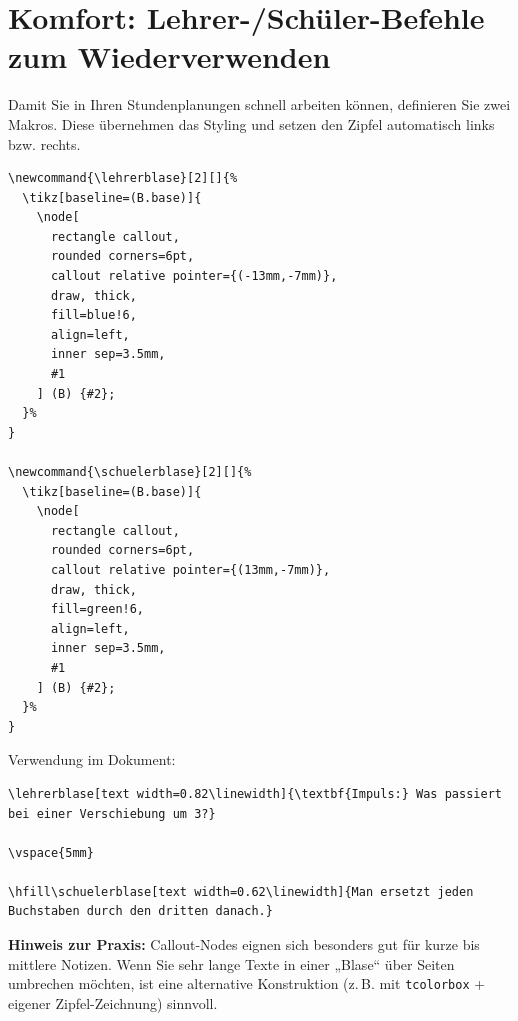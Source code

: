 \begin{ausgabe}
\begin{center}
\end{center}
\end{ausgabe}

\section{Komfort: Lehrer-/Schüler-Befehle zum Wiederverwenden}

Damit Sie in Ihren Stundenplanungen schnell arbeiten können, definieren Sie zwei Makros. Diese übernehmen das Styling und setzen den Zipfel automatisch links bzw. rechts.

\begin{lstlisting}[style=latex]
\newcommand{\lehrerblase}[2][]{%
  \tikz[baseline=(B.base)]{
    \node[
      rectangle callout,
      rounded corners=6pt,
      callout relative pointer={(-13mm,-7mm)},
      draw, thick,
      fill=blue!6,
      align=left,
      inner sep=3.5mm,
      #1
    ] (B) {#2};
  }%
}

\newcommand{\schuelerblase}[2][]{%
  \tikz[baseline=(B.base)]{
    \node[
      rectangle callout,
      rounded corners=6pt,
      callout relative pointer={(13mm,-7mm)},
      draw, thick,
      fill=green!6,
      align=left,
      inner sep=3.5mm,
      #1
    ] (B) {#2};
  }%
}
\end{lstlisting}

\noindent Verwendung im Dokument:

\begin{lstlisting}[style=latex]
\lehrerblase[text width=0.82\linewidth]{\textbf{Impuls:} Was passiert bei einer Verschiebung um 3?}

\vspace{5mm}

\hfill\schuelerblase[text width=0.62\linewidth]{Man ersetzt jeden Buchstaben durch den dritten danach.}
\end{lstlisting}

\begin{ausgabe}

\vspace{5mm}

\hfill{}
\end{ausgabe}

\noindent\textbf{Hinweis zur Praxis:} Callout-Nodes eignen sich besonders gut für kurze bis mittlere Notizen. Wenn Sie sehr lange Texte in einer „Blase“ über Seiten umbrechen möchten, ist eine alternative Konstruktion (z.\,B. mit \texttt{tcolorbox} + eigener Zipfel-Zeichnung) sinnvoll.


